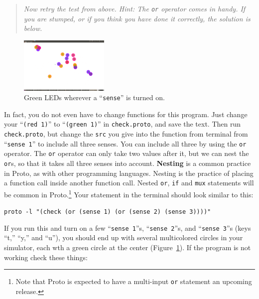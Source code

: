\documentclass{article}
\newcommand\code[1]{\begin{center}\var{#1}\end{center}}
\newcommand\problem[1]{\begin{quote}{\em #1}\end{quote}}
\newcommand\var[1]{{\tt #1}}
\newcommand\qvar[1]{``{\tt #1}''}
\begin{document}
\problem{Now retry the test from above.  Hint: The \var{or} operator
  comes in handy.  If you are stumped, or if you think you have done
  it correctly, the solution is below.}

\begin{figure}
  \vspace{-0.8cm}
  \includegraphics[width=0.38\textwidth]{figures/sense-led.png}
  \caption{Green LEDs wherever a \qvar{sense} is turned on.}
  \vspace{-0.5cm}
  \label{f:leds}
\end{figure}

In fact, you do not even have to change functions for this program.
Just change your \qvar{(red 1)} to \qvar{(green 1)} in
\var{check.proto}, and save the text.  Then run \var{check.proto}, but
change the \var{src} you give into the function from terminal from
\qvar{sense 1} to include all three senses.  You can include all three
by using the \var{or} operator.  The \var{or} operator can only take
two values after it, but we can nest the \var{or}s, so that it takes
all three senses into account.  {\bf Nesting} is a common practice in
Proto, as with other programming languages.  Nesting is the practice
of placing a function call inside another function call.  Nested
\var{or}, \var{if} and \var{mux} statements will be common in
Proto.\footnote{Note that Proto is expected to have a multi-input
  \var{or} statement an upcoming release.}  Your statement in the
terminal should look similar to this:

\code{proto -l "(check (or (sense 1) (or (sense 2) (sense 3))))"}

If you run this and turn on a few \qvar{sense 1}s, \qvar{sense 2}s,
and \qvar{sense 3}s (keys ``t,'' ``y,'' and ``u''), you should end up
with several multicolored circles in your simulator, each wth a green
circle at the center (Figure~\ref{f:leds}).  If the program is not
working check these things:
\end{document}
